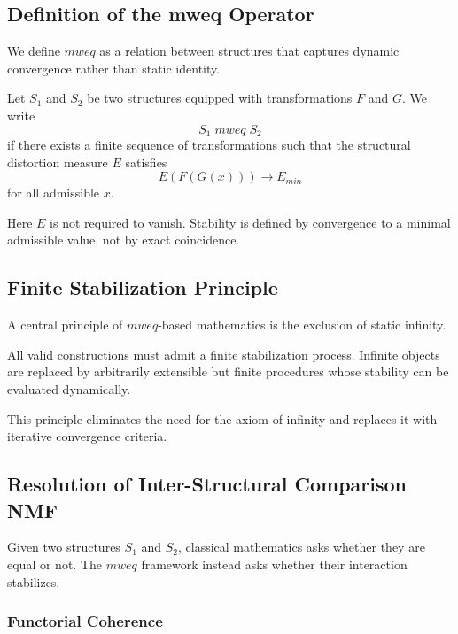 \documentclass[11pt]{article}
\begin{document}
\subsection{Definition of the mweq Operator}

We define $mweq$ as a relation between structures that captures
dynamic convergence rather than static identity.

\begin{definition}
Let $S_1$ and $S_2$ be two structures equipped with transformations
$F$ and $G$.
We write
\[
S_1 \; mweq \; S_2
\]
if there exists a finite sequence of transformations such that the
structural distortion measure $E$ satisfies
\[
E(F(G(x))) \rightarrow E_{min}
\]
for all admissible $x$.
\end{definition}

Here $E$ is not required to vanish.
Stability is defined by convergence to a minimal admissible value,
not by exact coincidence.

\subsection{Finite Stabilization Principle}

A central principle of $mweq$-based mathematics is the exclusion of
static infinity.

\begin{principle}
All valid constructions must admit a finite stabilization process.
Infinite objects are replaced by arbitrarily extensible but finite
procedures whose stability can be evaluated dynamically.
\end{principle}

This principle eliminates the need for the axiom of infinity and
replaces it with iterative convergence criteria.

\subsection{Resolution of Inter-Structural Comparison NMF}

Given two structures $S_1$ and $S_2$, classical mathematics asks whether
they are equal or not.
The $mweq$ framework instead asks whether their interaction stabilizes.

\subsubsection{Functorial Coherence}
\end{document}
